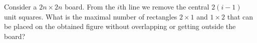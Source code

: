 Consider a $2n \times 2n$ board.  From the $i$th line we remove the central $2(i-1)$ unit squares. What is the maximal number of rectangles $2 \times 1$ and $1 \times 2$ that can be placed on the obtained figure without overlapping or getting outside the board?